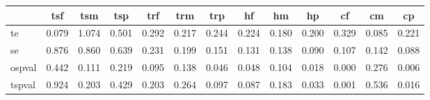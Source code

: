 \begin{table}[htbp]
\begin{tabular}{lcccccccccccc} \hline \hline
 & tsf  & tsm  & tsp  & trf  & trm  & trp  & hf  & hm  & hp  & cf  & cm  & cp  \\  \hline 
te &     0.079 &     1.074 &     0.501 &     0.292 &     0.217 &     0.244 &     0.224 &     0.180 &     0.200 &     0.329 &     0.085 &     0.221 \\  
se &     0.876 &     0.860 &     0.639 &     0.231 &     0.199 &     0.151 &     0.131 &     0.138 &     0.090 &     0.107 &     0.142 &     0.088 \\  
ospval &     0.442 &     0.111 &     0.219 &     0.095 &     0.138 &     0.046 &     0.048 &     0.104 &     0.018 &     0.000 &     0.276 &     0.006 \\  
tspval &     0.924 &     0.203 &     0.429 &     0.203 &     0.264 &     0.097 &     0.087 &     0.183 &     0.033 &     0.001 &     0.536 &     0.016 \\  
\hline \hline \end{tabular}
\end{table}

